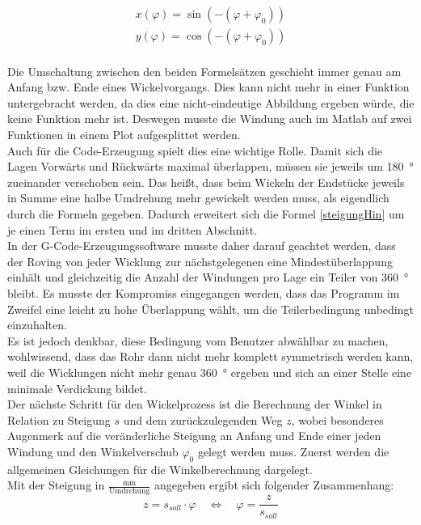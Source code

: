 \documentclass[paper=A4,pagesize,DIV=18, 12pt,listof=totoc,bibliography=totoc,headings=optiontohead,open=any]{article}
\begin{document}
\begin{eqnarray}\label{zylinder2kartesischRück}
	x(\varphi) = \sin(-(\varphi + \varphi_0))\\
	y(\varphi) = \cos(-(\varphi + \varphi_0))
\end{eqnarray}\\
Die Umschaltung zwischen den beiden Formelsätzen geschieht immer genau am Anfang bzw. Ende eines Wickelvorgangs. Dies kann nicht mehr in einer Funktion untergebracht werden, da dies eine nicht-eindeutige Abbildung ergeben würde, die keine Funktion mehr ist. Deswegen musste die Windung auch im Matlab auf zwei Funktionen in einem Plot aufgesplittet werden. \\
Auch für die Code-Erzeugung spielt dies eine wichtige Rolle. Damit sich die Lagen Vorwärts und Rückwärts maximal überlappen, müssen sie jeweils um \SI{180}{\degree} zueinander verschoben sein. Das heißt, dass beim Wickeln der Endstücke jeweils in Summe eine halbe Umdrehung mehr gewickelt werden muss, als eigendlich durch die Formeln gegeben. Dadurch erweitert sich die Formel \eqref{steigungHin} um je einen Term im ersten und im dritten Abschnitt.\\
In der G-Code-Erzeugungssoftware musste daher darauf geachtet werden, dass der Roving von jeder Wicklung zur nächstgelegenen eine Mindestüberlappung einhält und gleichzeitig die Anzahl der Windungen pro Lage ein Teiler von \SI{360}{\degree} bleibt. Es musste der Kompromiss eingegangen werden, dass das Programm im Zweifel eine leicht zu hohe Überlappung wählt, um die Teilerbedingung unbedingt einzuhalten.\\
Es ist jedoch denkbar, diese Bedingung vom Benutzer abwählbar zu machen, wohlwissend, dass das Rohr dann nicht mehr komplett symmetrisch werden kann, weil die Wicklungen nicht mehr genau \SI{360}{\degree} ergeben und sich an einer Stelle eine minimale Verdickung bildet.\\
Der nächste Schritt für den Wickelprozess ist die Berechnung der Winkel in Relation zu Steigung $s$ und dem zurückzulegenden Weg $z$, wobei besonderes Augenmerk auf die veränderliche Steigung an Anfang und Ende einer jeden Windung und den Winkelverschub $\varphi_0$ gelegt werden muss. Zuerst werden die allgemeinen Gleichungen für die Winkelberechnung dargelegt.\\
Mit der Steigung in $\frac{\text{mm}}{\text{Umdrehung}}$ angegeben ergibt sich folgender Zusammenhang:\\
\begin{equation}\label{SteigungMalWinkel}
	z = s_{soll} \cdot \varphi \quad \iff \quad \varphi = \frac{z}{s_{soll}}
\end{equation}\\
\end{document}
